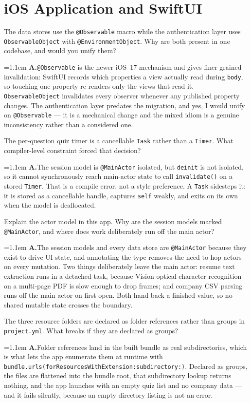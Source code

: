 \documentclass[11pt,a4paper]{article}
\newcommand{\code}[1]{\texttt{\small #1}}
\newcommand{\ans}[1]{%
  \par\vspace{0.32em}%
  \begingroup
  \small\color{answerink}%
  \leftskip=1.1em
  \noindent\textbf{\color{accent}A.}\hspace{0.45em}#1\par
  \endgroup
  \vspace{0.1em}%
}
\begin{document}
\section{iOS Application and SwiftUI}
\begin{questions}[resume]

\item The data stores use the \code{@Observable} macro while the authentication
layer uses \code{ObservableObject} with \code{@EnvironmentObject}. Why are both
present in one codebase, and would you unify them?
\ans{\code{@Observable} is the newer iOS~17 mechanism and gives finer-grained
invalidation: SwiftUI records which properties a view actually read during
\code{body}, so touching one property re-renders only the views that read it.
\code{ObservableObject} invalidates every observer whenever any published
property changes. The authentication layer predates the migration, and yes, I
would unify on \code{@Observable} --- it is a mechanical change and the mixed
idiom is a genuine inconsistency rather than a considered one.}

\item The per-question quiz timer is a cancellable \code{Task} rather than a
\code{Timer}. What compiler-level constraint forced that decision?
\ans{The session model is \code{@MainActor} isolated, but \code{deinit} is not
isolated, so it cannot synchronously reach main-actor state to call
\code{invalidate()} on a stored \code{Timer}. That is a compile error, not a style
preference. A \code{Task} sidesteps it: it is stored as a cancellable handle,
captures \code{self} weakly, and exits on its own when the model is deallocated.}

\item Explain the actor model in this app. Why are the session models marked
\code{@MainActor}, and where does work deliberately run off the main actor?
\ans{The session models and every data store are \code{@MainActor} because they
exist to drive UI state, and annotating the type removes the need to hop actors
on every mutation. Two things deliberately leave the main actor: resume text
extraction runs in a detached task, because Vision optical character recognition
on a multi-page PDF is slow enough to drop frames; and company CSV parsing runs
off the main actor on first open. Both hand back a finished value, so no shared
mutable state crosses the boundary.}

\item The three resource folders are declared as folder references rather than
groups in \code{project.yml}. What breaks if they are declared as groups?
\ans{Folder references land in the built bundle as real subdirectories, which is
what lets the app enumerate them at runtime with
\code{bundle.urls(forResourcesWithExtension:subdirectory:)}. Declared as groups,
the files are flattened into the bundle root, that subdirectory lookup returns
nothing, and the app launches with an empty quiz list and no company data --- and
it fails silently, because an empty directory listing is not an error.}


\end{questions}
\end{document}
